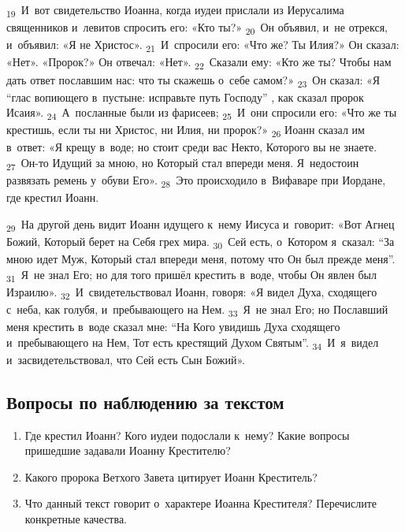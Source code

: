 \documentclass[a4paper,12pt]{article}
\begin{document}
\textsubscript{19}~И~вот свидетельство Иоанна, когда иудеи прислали из Иерусалима священников и~левитов спросить его: «Кто ты?»
\textsubscript{20}~Он объявил, и~не отрекся, и~объявил: «Я не Христос».
\textsubscript{21}~И~спросили его: «Что же? Ты Илия?» Он сказал: «Нет». «Пророк?» Он отвечал: «Нет».
\textsubscript{22}~Сказали ему: «Кто же ты? Чтобы нам дать ответ пославшим нас: что ты скажешь о~себе самом?»
\textsubscript{23}~Он сказал: «Я “глас вопиющего в~пустыне: исправьте путь Господу” , как сказал пророк Исаия».
\textsubscript{24}~А~посланные были из фарисеев;
\textsubscript{25}~И~они спросили его: «Что же ты крестишь, если ты ни Христос, ни Илия, ни пророк?»
\textsubscript{26} Иоанн сказал им в~ответ: «Я крещу в~воде; но стоит среди вас Некто, Которого вы не знаете.
\textsubscript{27}~Он-то Идущий за мною, но Который стал впереди меня. Я~недостоин развязать ремень у~обуви Его».
\textsubscript{28}~Это происходило в~Вифаваре при Иордане, где крестил Иоанн. 
 
\textsubscript{29}~На другой день видит Иоанн идущего к~нему Иисуса и~говорит: «Вот Агнец Божий, Который берет на Себя грех мира.
\textsubscript{30}~Сей есть, о~Котором я~сказал: “За мною идет Муж, Который стал впереди меня, потому что Он был прежде меня”.
\textsubscript{31}~Я~не знал Его; но для того пришёл крестить в~воде, чтобы Он явлен был Израилю».
\textsubscript{32}~И~свидетельствовал Иоанн, говоря: «Я видел Духа, сходящего с~неба, как голубя, и~пребывающего на Нем.
\textsubscript{33}~Я~не знал Его; но Пославший меня крестить в~воде сказал мне: “На Кого увидишь Духа сходящего и~пребывающего на Нем, Тот есть крестящий Духом Святым”.
\textsubscript{34}~И~я~видел и~засвидетельствовал, что Сей есть Сын Божий».

\subsection*{Вопросы по наблюдению за текстом}
\begin{enumerate}
    \item Где крестил Иоанн? Кого иудеи подослали к~нему? Какие вопросы пришедшие задавали Иоанну Крестителю? 
    
    \myline
    
    \myline
    \item Какого пророка Ветхого Завета цитирует Иоанн Креститель? 
    
    \myline
    
    \myline
    \item Что данный текст говорит о~характере Иоанна Крестителя? Перечислите конкретные качества.
    
    \myline
    
    \myline
\end{enumerate}
\end{document}
